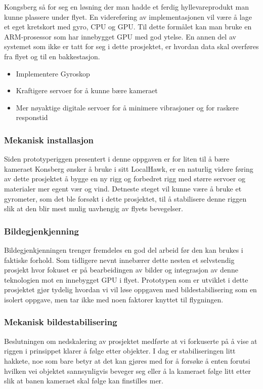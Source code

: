 Kongsberg så for seg en løsning der man hadde et ferdig hyllevareprodukt man kunne plassere under flyet. En videreføring av implementasjonen vil være å lage et eget kretskort med gyro, CPU og GPU. Til dette formålet kan man bruke en ARM-prosessor som har innebygget GPU med god ytelse. En annen del av systemet som ikke er tatt for seg i dette prosjektet, er hvordan data skal overføres fra flyet og til en bakkestasjon. 

\begin{itemize}

\item Implementere Gyroskop



\item Kraftigere servoer for å kunne bære kameraet



\item Mer nøyaktige digitale servoer for å minimere vibrasjoner og for raskere responstid

\end{itemize} 

\subsubsection{Mekanisk installasjon}

Siden prototyperiggen presentert i denne oppgaven er for liten til å bære kameraet Konsberg ønsker å bruke i sitt LocalHawk, er en naturlig videre føring av dette prosjektet å bygge en ny rigg og forbedret rigg med større servoer og materialer mer egent vær og vind. Detneste steget vil kunne være å bruke et gyrometer, som det ble forsøkt i dette prosjektet, til å stabilisere denne riggen slik at den blir mest mulig uavhengig av flyets bevegelser. 

\subsubsection{Bildegjenkjenning}
Bildegjenkjenningen trenger fremdeles en god del arbeid før den kan brukes i faktiske forhold. Som tidligere nevnt innebærer dette nesten et selvstendig prosjekt hvor fokuset er på bearbeidingen av bilder og integrasjon av denne teknologien mot en innebygget GPU i flyet. Prototypen som er utviklet i dette prosjektet gjør tydelig hvordan vi vil løse oppgaven med bildestabilisering som en isolert oppgave, men tar ikke med noen faktorer knyttet til flygningen.

\subsubsection{Mekanisk bildestabilisering}
Beslutningen om nedskalering av prosjektet medførte at vi forkuserte på å vise at riggen i prinsippet klarer å følge etter objekter. I dag er stabiliseringen litt hakkete, noe som bare betyr at det kan gjøres med for å forsøke å enten forutsi hvilken vei objektet sannsynligvis beveger seg eller å la kameraet følge litt etter slik at banen kameraet skal følge kan finstilles mer.



